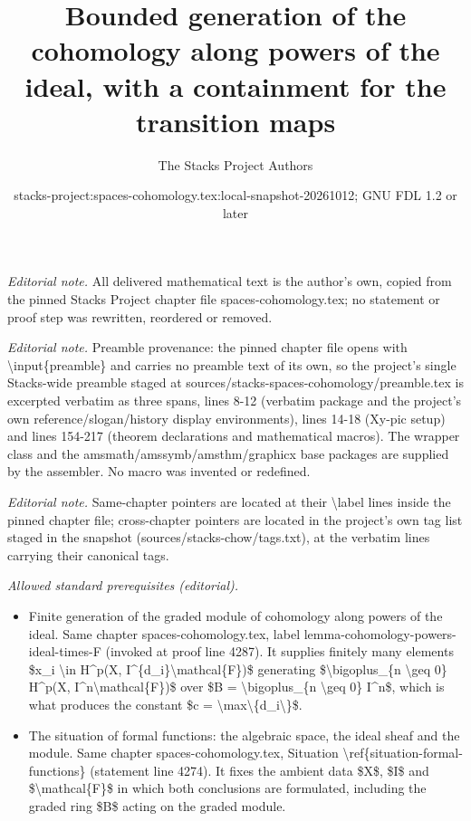 \documentclass[10pt,a4paper]{amsart}
\title{Bounded generation of the cohomology along powers of the ideal, with a containment for the transition maps}
\author{The Stacks Project Authors}
\date{stacks-project:spaces-cohomology.tex:local-snapshot-20261012; GNU FDL 1.2 or later}
\theoremstyle{plain}
\theoremstyle{definition}
\theoremstyle{remark}
\numberwithin{equation}{subsection}
\begin{document}
\maketitle
\noindent\textit{Editorial note.} All delivered mathematical text is the author's own, copied from the pinned Stacks Project chapter file spaces-cohomology.tex; no statement or proof step was rewritten, reordered or removed.\par\medskip
\noindent\textit{Editorial note.} Preamble provenance: the pinned chapter file opens with \textbackslash{}input\{preamble\} and carries no preamble text of its own, so the project's single Stacks-wide preamble staged at sources/stacks-spaces-cohomology/preamble.tex is excerpted verbatim as three spans, lines 8-12 (verbatim package and the project's own reference/slogan/history display environments), lines 14-18 (Xy-pic setup) and lines 154-217 (theorem declarations and mathematical macros). The wrapper class and the amsmath/amssymb/amsthm/graphicx base packages are supplied by the assembler. No macro was invented or redefined.\par\medskip
\noindent\textit{Editorial note.} Same-chapter pointers are located at their \textbackslash{}label lines inside the pinned chapter file; cross-chapter pointers are located in the project's own tag list staged in the snapshot (sources/stacks-chow/tags.txt), at the verbatim lines carrying their canonical tags.\par\medskip
\noindent\textit{Allowed standard prerequisites (editorial).}\begin{itemize}
\item Finite generation of the graded module of cohomology along powers of the ideal. Same chapter spaces-cohomology.tex, label lemma-cohomology-powers-ideal-times-F (invoked at proof line 4287). It supplies finitely many elements \$x\_i \textbackslash{}in H\textasciicircum{}p(X, I\textasciicircum{}\{d\_i\}\textbackslash{}mathcal\{F\})\$ generating \$\textbackslash{}bigoplus\_\{n \textbackslash{}geq 0\} H\textasciicircum{}p(X, I\textasciicircum{}n\textbackslash{}mathcal\{F\})\$ over \$B = \textbackslash{}bigoplus\_\{n \textbackslash{}geq 0\} I\textasciicircum{}n\$, which is what produces the constant \$c = \textbackslash{}max\textbackslash{}\{d\_i\textbackslash{}\}\$.
\item The situation of formal functions: the algebraic space, the ideal sheaf and the module. Same chapter spaces-cohomology.tex, Situation \textbackslash{}ref\{situation-formal-functions\} (statement line 4274). It fixes the ambient data \$X\$, \$I\$ and \$\textbackslash{}mathcal\{F\}\$ in which both conclusions are formulated, including the graded ring \$B\$ acting on the graded module.
\end{itemize}\medskip
\end{document}
